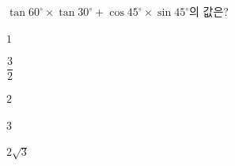 $\tan 60^\circ\times\tan 30^\circ+\cos 45^\circ\times\sin 45^\circ$의 값은?
\begin{choices32}{\rule[-3ex]{0pt}{8ex}$1$}{\rule[-3ex]{0pt}{8ex}$\dfrac{3}{2}$}{\rule[-3ex]{0pt}{8ex}$2$}{\rule[-3ex]{0pt}{8ex}$3$}{\rule[-3ex]{0pt}{8ex}$2\sqrt{3}$}\end{choices32}
